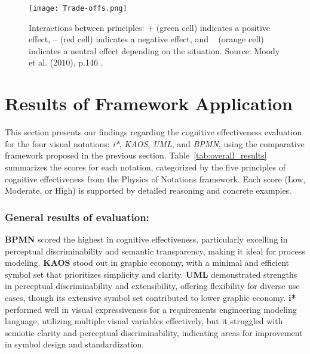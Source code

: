 \documentclass[runningheads]{llncs}
\begin{document}
\begin{figure}[h!]
\centering
\texttt{[image: Trade-offs.png]}
\caption{Interactions between principles: + (green cell) indicates a positive effect, -- (red cell) indicates a negative effect, and ~ (orange cell) indicates a neutral effect depending on the situation. Source: Moody et al. (2010), p.146 \cite{Moody2010}.}
\label{fig:principle-interactions}
\end{figure}


\section{Results of Framework Application}
This section presents our findings regarding the cognitive effectiveness evaluation for the four visual notations: \textit{i*}, \textit{KAOS}, \textit{UML}, and \textit{BPMN}, using the comparative framework proposed in the previous section. Table~\ref{tab:overall_results} summarizes the scores for each notation, categorized by the five principles of cognitive effectiveness from the Physics of Notations framework. Each score (Low, Moderate, or High) is supported by detailed reasoning and concrete examples.

\subsubsection{General results of evaluation: }\textbf{BPMN} scored the highest in cognitive effectiveness, particularly excelling in perceptual discriminability and semantic transparency, making it ideal for process modeling. \textbf{KAOS }stood out in graphic economy, with a minimal and efficient symbol set that prioritizes simplicity and clarity. \textbf{UML} demonstrated strengths in perceptual discriminability and extensibility, offering flexibility for diverse use cases, though its extensive symbol set contributed to lower graphic economy.\textbf{ i*} performed well in visual expressiveness for a requirements engineering modeling language, utilizing multiple visual variables effectively, but it struggled with semiotic clarity and perceptual discriminability, indicating areas for improvement in symbol design and standardization.
\end{document}
